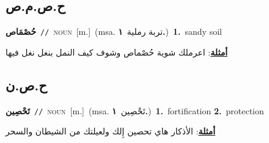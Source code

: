 \documentclass[10pt,a4paper,twoside]{article} %
\begin{document}
\begin{multicols}{2}
\vspace{-3mm}
\subsection*{\color{blue}\foreignlanguage{arabic}{ح.ص.م.ص}\color{blue}{ (ntws)}} 

{\setlength\topsep{0pt}\textbf{\foreignlanguage{arabic}{حُصْمَاص}}\ {\color{gray}\texttt{//}\color{black}}\ \textsc{noun}\ [m.]\ \color{gray}(msa. \foreignlanguage{arabic}{تربة رملية}~\foreignlanguage{arabic}{\textbf{١.}})\color{black}\ \textbf{1.}~sandy soil\  \begin{flushright}\color{gray}\foreignlanguage{arabic}{\textbf{\underline{\foreignlanguage{arabic}{أمثلة}}}: اعرملك شوية حُصْماص وشوف كيف النمل بنغل نغل فيها}\end{flushright}\color{black}} \vspace{2mm}

\vspace{-3mm}
\subsection*{\color{blue}\foreignlanguage{arabic}{ح.ص.ن}\color{blue}{}} 

{\setlength\topsep{0pt}\textbf{\foreignlanguage{arabic}{تَحْصِين}}\ {\color{gray}\texttt{//}\color{black}}\ \textsc{noun}\ [m.]\ \color{gray}(msa. \foreignlanguage{arabic}{تَحْصِين}~\foreignlanguage{arabic}{\textbf{١.}})\color{black}\ \textbf{1.}~fortification  \textbf{2.}~protection\  \begin{flushright}\color{gray}\foreignlanguage{arabic}{\textbf{\underline{\foreignlanguage{arabic}{أمثلة}}}: الأذكار هاي تحصين إِلك ولعيلتك من الشيطان والسحر}\end{flushright}\color{black}} \vspace{2mm}


\end{multicols}
\end{document}
